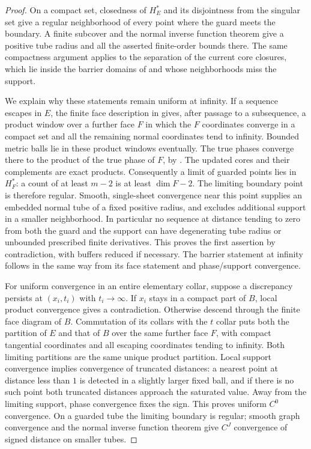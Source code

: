 \documentclass[11pt]{article}
\numberwithin{equation}{section}
\theoremstyle{definition}
\theoremstyle{remark}
\begin{document}
\begin{proof}
On a compact set, closedness of $H_E^*$ and its disjointness from the
singular set give a regular neighborhood of every point where the guard
meets the boundary.  A finite subcover and the normal inverse function
theorem give a positive tube radius and all the asserted finite-order
bounds there.  The same compactness argument applies to the separation
of the current core closures, which lie inside the barrier domains of
 and whose neighborhoods miss the support.

We explain why these statements remain uniform at infinity.  If a
sequence escapes in $E$, the finite face description in
 gives, after passage to a subsequence, a product
window over a further face $F$ in which the $F$ coordinates converge
in a compact set and all the remaining normal coordinates tend to
infinity.  Bounded metric balls lie in these product windows eventually.
The true phases converge there to the product of the true phase of
$F$, by .  The updated cores and their
complements are exact products.  Consequently a limit of guarded points
lies in $H_F^*$: a count of at least $m-2$ is at least
$\dim F-2$.  The limiting boundary point is therefore regular.
Smooth, single-sheet convergence near this point supplies an embedded
normal tube of a fixed positive radius, and excludes additional support
in a smaller neighborhood.  In particular no sequence at distance
tending to zero from both the guard and the support can have degenerating
tube radius or unbounded prescribed finite derivatives.  This proves
the first assertion by contradiction, with buffers reduced if necessary.
The barrier statement at infinity follows in the same way from its
face statement and phase/support convergence.

For uniform convergence in an entire elementary collar, suppose a
discrepancy persists at $(x_i,t_i)$ with $t_i\to\infty$.  If $x_i$
stays in a compact part of $B$, local product convergence gives a
contradiction.  Otherwise descend through the finite face diagram of
$B$.  Commutation of its collars with the $t$ collar puts both the
partition of $E$ and that of $B$ over the same further face $F$,
with compact tangential coordinates and all escaping coordinates tending
to infinity.  Both limiting partitions are the same unique product
partition.  Local support convergence implies convergence of truncated
distances: a nearest point at distance less than $1$ is detected in a
slightly larger fixed ball, and if there is no such point both truncated
distances approach the saturated value.  Away from the limiting support,
phase convergence fixes the sign.  This proves uniform $C^0$
convergence.  On a guarded tube the limiting boundary is regular; smooth
graph convergence and the normal inverse function theorem give $C^J$
convergence of signed distance on smaller tubes.


\end{proof}
\end{document}
